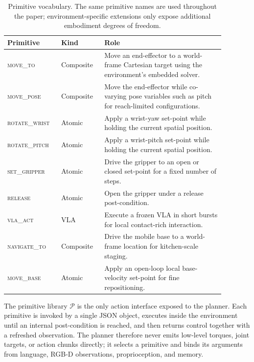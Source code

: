 \documentclass{article}
\begin{document}
\begin{table}[htbp]
\centering
\caption{Primitive vocabulary. The same primitive names are used throughout the paper; environment-specific extensions only expose additional embodiment degrees of freedom.}
\label{tab:primitive_vocabulary}
\small
\setlength{\tabcolsep}{4pt}
\begin{tabular}{p{0.20\linewidth}p{0.18\linewidth}p{0.50\linewidth}}
\toprule
Primitive & Kind & Role \\
\midrule
\textsc{move\_to} & Composite & Move an end-effector to a world-frame Cartesian target using the environment's embedded solver. \\
\textsc{move\_pose} & Composite & Move the end-effector while co-varying pose variables such as pitch for reach-limited configurations. \\
\textsc{rotate\_wrist} & Atomic & Apply a wrist-yaw set-point while holding the current spatial position. \\
\textsc{rotate\_pitch} & Atomic & Apply a wrist-pitch set-point while holding the current spatial position. \\
\textsc{set\_gripper} & Atomic & Drive the gripper to an open or closed set-point for a fixed number of steps. \\
\textsc{release} & Atomic & Open the gripper under a release post-condition. \\
\textsc{vla\_act} & VLA & Execute a frozen VLA in short bursts for local contact-rich interaction. \\
\midrule
\textsc{navigate\_to} & Composite & Drive the mobile base to a world-frame location for kitchen-scale staging. \\
\textsc{move\_base} & Atomic & Apply an open-loop local base-velocity set-point for fine repositioning. \\
\bottomrule
\end{tabular}
\end{table}

The primitive library $\mathcal{P}$ is the only action interface exposed to the planner. Each primitive is invoked by a single JSON object, executes inside the environment until an internal post-condition is reached, and then returns control together with a refreshed observation. The planner therefore never emits low-level torques, joint targets, or action chunks directly; it selects a primitive and binds its arguments from language, RGB-D observations, proprioception, and memory.
\end{document}
